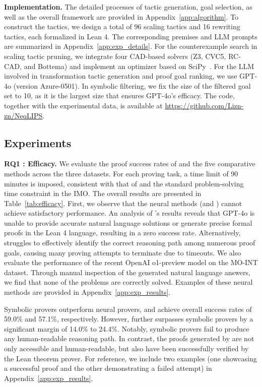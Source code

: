 \textbf{Implementation. } 
The detailed processes of tactic generation, goal selection, as well as the overall framework are provided in Appendix~\ref{app:algorithm}.
To construct the tactics, 
we design a total of 96 scaling tactics and 16 rewriting tactics, each formalized in Lean 4.
The corresponding premises and LLM prompts are summarized in Appendix~\ref{app:exp_details}.
For the counterexample search in scaling tactic pruning, we integrate four CAD-based solvers (Z3, CVC5, RC-CAD, and Bottema) and implement an optimizer based on SciPy~\citep{virtanen2020scipy}.
For the LLM involved in transformation tactic generation and proof goal ranking, we use GPT-4o (version Azure-0501). In symbolic filtering, we fix the size of the filtered goal set to 10, as it is the largest size that ensures GPT-4o's efficacy. The code, together with the experimental data, is available at \url{https://github.com/Lizn-zn/NeqLIPS}.

\vspace{-0.3em}
\subsection{Experiments}
\vspace{-0.3em}



\textbf{RQ1 : Efficacy. }  
We evaluate the proof success rates of \name and the five comparative methods across the three datasets. For each proving task, a time limit of 90 minutes is imposed, consistent with that of \aips and the standard problem-solving time constraint in the IMO. The overall results are presented in Table~\ref{tab:efficacy}.
First, we observe that the neural methods (\dsp and \mcts) cannot achieve satisfactory performance. 
An analysis of \dsp's results reveals that GPT-4o is unable to provide accurate natural language solutions or generate precise formal proofs in the Lean 4 language, resulting in a zero success rate.
Alternatively, \mcts struggles to effectively identify the correct reasoning path among numerous proof goals, causing many proving attempts to terminate due to timeouts.
We also evaluate the performance of the recent OpenAI o1-preview model on the MO-INT dataset. 
Through manual inspection of the generated natural language answers, we find that none of the problems are correctly solved.
Examples of these neural methods are provided in Appendix~\ref{app:exp_results}.

Symbolic provers outperform neural provers,
\cad and \mma achieve overall success rates of 59.0\% and 57.1\%, respectively.
However,
{\name} further surpasses symbolic provers by a significant margin of 14.0\% to 24.4\%. 
Notably, 
symbolic provers fail to produce any human-readable reasoning path.
In contrast,
the proofs generated by \name are not only accessible and human-readable, but also have been successfully verified by the Lean theorem prover.
For reference, we include two examples (one showcasing a successful proof and the other demonstrating a failed attempt) in Appendix~\ref{app:exp_results}.

